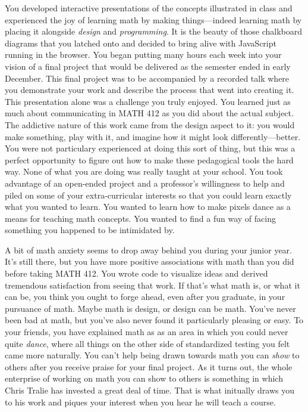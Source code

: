 \documentclass[../main.tex]{subfiles}
\begin{document}
You developed interactive presentations of the concepts illustrated in class and experienced the joy of learning math by making things---indeed learning math by placing it alongside \textit{design} and \textit{programming}. It is the beauty of those chalkboard diagrams that you latched onto and decided to bring alive with JavaScript running in the browser. You began putting many hours each week into your vision of a final project that would be delivered as the semester ended in early December. This final project was to be accompanied by a recorded talk where you demonstrate your work and describe the process that went into creating it. This presentation alone was a challenge you truly enjoyed. You learned just as much about communicating in MATH 412 as you did about the actual subject. The addictive nature of this work came from the design aspect to it: you would make something, play with it, and imagine how it might look differently---better. You were not particulary experienced at doing this sort of thing, but this was a perfect opportunity to figure out how to make these pedagogical tools the hard way. None of what you are doing was really taught at your school. You took advantage of an open-ended project and a professor's willingness to help and piled on some of your extra-curricular interests so that you could learn exactly what you wanted to learn. You wanted to learn how to make pixels dance as a means for teaching math concepts. You wanted to find a fun way of facing something you happened to be intimidated by.

A bit of math anxiety seems to drop away behind you during your junior year. It's still there, but you have more positive associations with math than you did before taking MATH 412. You wrote code to visualize ideas and derived tremendous satisfaction from seeing that work. If that's what math is, or what it can be, you think you ought to forge ahead, even after you graduate, in your pursuance of math. Maybe math is design, or design can be math. You've never been bad at math, but you've also never found it particularly pleasing or easy. To your friends, you have explained math as as an area in which you could never quite \textit{dance}, where all things on the other side of standardized testing you felt came more naturally. You can't help being drawn towards math you can \textit{show} to others after you receive praise for your final project. As it turns out, the whole enterprise of working on math you can show to others is something in which Chris Tralie has invested a great deal of time. That is what initually draws you to his work and piques your interest when you hear he will teach a course.
\end{document}
